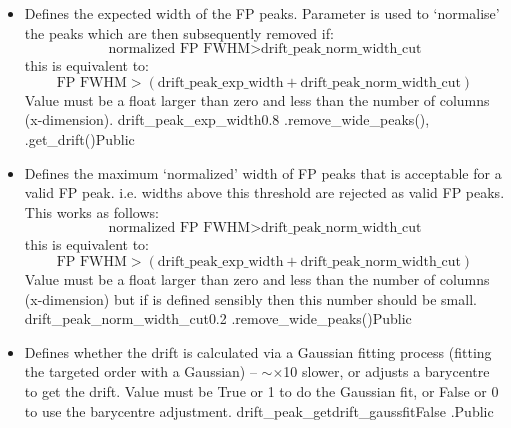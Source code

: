 \begin{itemize}
\item {} 
{Defines the expected width of the FP peaks. Parameter is used to `normalise' the peaks which are then subsequently removed if:
\begin{equation}
\text{normalized FP FWHM} > \text{drift\_peak\_norm\_width\_cut}
\end{equation}
this is equivalent to:
\begin{equation}
\text{FP FWHM} > (\text{drift\_peak\_exp\_width} + \text{drift\_peak\_norm\_width\_cut})
\end{equation}
Value must be a float larger than zero and less than the number of columns (x-dimension).
}
{drift\_peak\_exp\_width}{0.8}
{\calDRIFTPEAK}{\constantsfile}{\spirouRV.remove\_wide\_peaks(), \spirouRV.get\_drift()}{Public}

\item {}
{Defines the maximum `normalized' width of FP peaks that is acceptable for a valid FP peak. i.e. widths above this threshold are rejected as valid FP peaks.
This works as follows:
\begin{equation}
\text{normalized FP FWHM} > \text{drift\_peak\_norm\_width\_cut}
\end{equation}
this is equivalent to:
\begin{equation}
\text{FP FWHM} > (\text{drift\_peak\_exp\_width} + \text{drift\_peak\_norm\_width\_cut})
\end{equation}
Value must be a float larger than zero and less than the number of columns (x-dimension) but if  is defined sensibly then this number should be small.
}
{drift\_peak\_norm\_width\_cut}{0.2}
{\calDRIFTPEAK}{\constantsfile}{\spirouRV.remove\_wide\_peaks()}{Public}

\item {}
{Defines whether the drift is calculated via a Gaussian fitting process (fitting the targeted order with a Gaussian) -- $\sim\times$10 slower, or adjusts a barycentre to get the drift. Value must be True or 1 to do the Gaussian fit, or False or 0 to use the barycentre adjustment.}
{drift\_peak\_getdrift\_gaussfit}{False}
{\calDRIFTPEAK}{\constantsfile}{\calDRIFTPEAK.\progMAIN}{Public}


\end{itemize}
